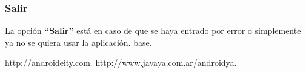 \documentclass[a4paper,11pt]{article}
\begin{document}
\subsubsection{Salir}

		La opci\'{o}n \textbf{``Salir''} est\'{a} en caso de que se haya entrado por error o simplemente ya no se quiera usar la aplicaci\'{o}n. base.
		\newline



\newpage

\begin{thebibliography}{99}
http://androideity.com.
 http://www.javaya.com.ar/androidya.
\end{thebibliography}
\end{document}
